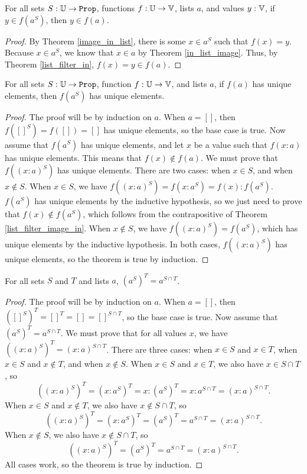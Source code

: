 \documentclass[../../math.tex]{subfiles}
\begin{document}
\begin{theorem} \label{list_filter_image_in}
    For all sets $S : \set{\U}$, functions $f : \mathbb{U} \to \mathbb{V}$, lists $a$, and
    values $y : \mathbb{V}$, if $y \in f(a^S)$, then $y \in f(a)$.
\end{theorem}
\begin{proof}
    By Theorem \ref{image_in_list}, there is some $x \in a^S$ such that $f(x) =
    y$.  Because $x \in a^S$, we know that $x \in a$ by Theorem
    \ref{in_list_image}.  Thus, by Theorem \ref{list_filter_in}, $f(x) = y \in
    f(a)$.
\end{proof}

\begin{theorem} \label{list_filter_image_unique}
    For all sets $S : \set{\U}$, function $f : \mathbb{U} \to \mathbb{V}$, and lists $a$, if
    $f(a)$ has unique elements, then $f(a^S)$ has unique elements.
\end{theorem}
\begin{proof}
    The proof will be by induction on $a$.  When $a = []$, then $f([]^S) = f([])
    = []$ has unique elements, so the base case is true.  Now assume that
    $f(a^S)$ has unique elements, and let $x$ be a value such that $f(x : a)$
    has unique elements.  This means that $f(x) \notin f(a)$.  We must prove
    that $f((x : a)^S)$ has unique elements.  There are two cases: when $x \in
    S$, and when $x \notin S$.  When $x \in S$, we have $f((x : a)^S) = f(x :
    a^S) = f(x) : f(a^S)$.  $f(a^S)$ has unique elements by the inductive
    hypothesis, so we just need to prove that $f(x) \notin f(a^S)$, which
    follows from the contrapositive of Theorem \ref{list_filter_image_in}.  When
    $x \notin S$, we have $f((x : a)^S) = f(a^S)$, which has unique elements by
    the inductive hypothesis.  In both cases, $f((x : a)^S)$ has unique
    elements, so the theorem is true by induction.
\end{proof}

\begin{theorem} \label{list_filter_inter}
    For all sets $S$ and $T$ and lists $a$, $(a^S)^T = a^{S \cap T}$.
\end{theorem}
\begin{proof}
    The proof will be by induction on $a$.  When $a = []$, then $([]^S)^T = []^T
    = [] = []^{S \cap T}$, so the base case is true.  Now assume that $(a^S)^T =
    a^{S \cap T}$.  We must prove that for all values $x$, we have $((x :
    a)^S)^T = (x : a)^{S \cap T}$.  There are three cases: when $x \in S$ and $x
    \in T$, when $x \in S$ and $x \notin T$, and when $x \notin S$.  When $x \in
    S$ and $x \in T$, we also have $x \in S \cap T$, so
    \[
        ((x : a)^S)^T = (x : a^S)^T = x : (a^S)^T = x : a^{S \cap T}
        = (x : a)^{S \cap T}.
    \]
    When $x \in S$ and $x \notin T$, we also have $x \notin S \cap T$, so
    \[
        ((x : a)^S)^T = (x : a^S)^T = (a^S)^T = a^{S \cap T}
        = (x : a)^{S \cap T}.
    \]
    When $x \notin S$, we also have $x \notin S \cap T$, so
    \[
        ((x : a)^S)^T = (a^S)^T = a^{S \cap T} = (x : a)^{S \cap T}.
    \]
    All cases work, so the theorem is true by induction.
\end{proof}
\end{document}
